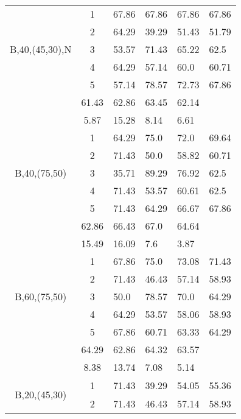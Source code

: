 \begin{table}[h]
{\begin{tabular}{cc|llll}
\multirow{5}{*}{\begin{sideways}B,40,(45,30),N\end{sideways}} & 1 & 67.86 & 67.86 & 67.86 & 67.86 \\
 & 2 & 64.29 & 39.29 & 51.43 & 51.79 \\
 & 3 & 53.57 & 71.43 & 65.22 & 62.5 \\
 & 4 & 64.29 & 57.14 & 60.0 & 60.71 \\
 & 5 & 57.14 & 78.57 & 72.73 & 67.86 \\
\rowcolor{lightgray!50}\multicolumn{2}{r|}{avg} & 61.43 & 62.86 & 63.45 & 62.14 \\
\rowcolor{lightgray!50}\multicolumn{2}{r|}{std} & 5.87 & 15.28 & 8.14 & 6.61 \\
\multirow{5}{*}{\begin{sideways}B,40,(75,50)\end{sideways}} & 1 & 64.29 & 75.0 & 72.0 & 69.64 \\
 & 2 & 71.43 & 50.0 & 58.82 & 60.71 \\
 & 3 & 35.71 & 89.29 & 76.92 & 62.5 \\
 & 4 & 71.43 & 53.57 & 60.61 & 62.5 \\
 & 5 & 71.43 & 64.29 & 66.67 & 67.86 \\
\rowcolor{lightgray!50}\multicolumn{2}{r|}{avg} & 62.86 & 66.43 & 67.0 & 64.64 \\
\rowcolor{lightgray!50}\multicolumn{2}{r|}{std} & 15.49 & 16.09 & 7.6 & 3.87 \\
\multirow{5}{*}{\begin{sideways}B,60,(75,50)\end{sideways}} & 1 & 67.86 & 75.0 & 73.08 & 71.43 \\
 & 2 & 71.43 & 46.43 & 57.14 & 58.93 \\
 & 3 & 50.0 & 78.57 & 70.0 & 64.29 \\
 & 4 & 64.29 & 53.57 & 58.06 & 58.93 \\
 & 5 & 67.86 & 60.71 & 63.33 & 64.29 \\
\rowcolor{lightgray!50}\multicolumn{2}{r|}{avg} & 64.29 & 62.86 & 64.32 & 63.57 \\
\rowcolor{lightgray!50}\multicolumn{2}{r|}{std} & 8.38 & 13.74 & 7.08 & 5.14 \\
\multirow{5}{*}{\begin{sideways}B,20,(45,30)\end{sideways}} & 1 & 71.43 & 39.29 & 54.05 & 55.36 \\
 & 2 & 71.43 & 46.43 & 57.14 & 58.93 \\

\end{tabular}}
\end{table}
